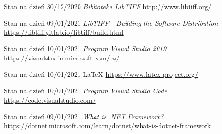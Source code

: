 \documentclass{article}
\begin{document}
\begin{thebibliography}{9}
        Stan na dzień 30/12/2020 
        \textit{Biblioteka LibTIFF}
        \url{http://www.libtiff.org/}

        Stan na dzień 09/01/2021 
        \textit{LibTIFF - Building the Software Distribution}
        \url{https://libtiff.gitlab.io/libtiff/build.html}

        Stan na dzień 10/01/2021 
        \textit{Program Visual Studio 2019}
        \url{https://visualstudio.microsoft.com/vs/}

        Stan na dzień 10/01/2021 
        \LaTeX \space
        \url{https://www.latex-project.org/}

        Stan na dzień 10/01/2021 
        \textit{Program Visual Studio Code}
        \url{https://code.visualstudio.com/}

        Stan na dzień 09/01/2021 
        \textit{What is .NET Framework?}
        \url{https://dotnet.microsoft.com/learn/dotnet/what-is-dotnet-framework}

    \end{thebibliography}
    \newpage
    \listoffigures
\end{document}
